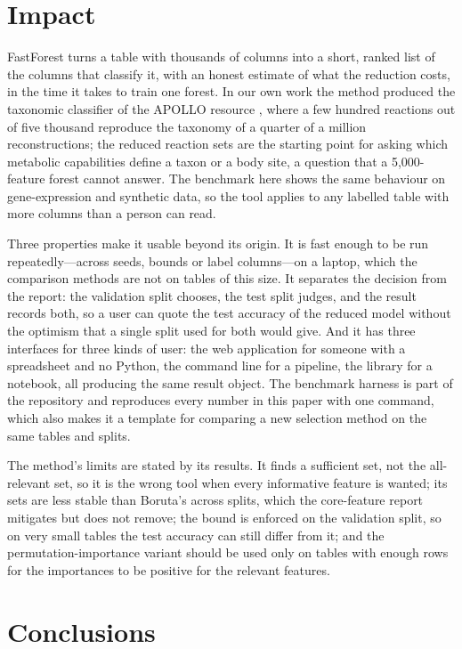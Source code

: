 \documentclass[11pt,a4paper]{article}
\begin{document}
\section{Impact}

FastForest turns a table with thousands of columns into a short, ranked list of the columns that classify it, with an honest estimate of what the reduction costs, in the time it takes to train one forest. In our own work the method produced the taxonomic classifier of the APOLLO resource \cite{heinken2025}, where a few hundred reactions out of five thousand reproduce the taxonomy of a quarter of a million reconstructions; the reduced reaction sets are the starting point for asking which metabolic capabilities define a taxon or a body site, a question that a 5,000-feature forest cannot answer. The benchmark here shows the same behaviour on gene-expression and synthetic data, so the tool applies to any labelled table with more columns than a person can read.

Three properties make it usable beyond its origin. It is fast enough to be run repeatedly---across seeds, bounds or label columns---on a laptop, which the comparison methods are not on tables of this size. It separates the decision from the report: the validation split chooses, the test split judges, and the result records both, so a user can quote the test accuracy of the reduced model without the optimism that a single split used for both would give. And it has three interfaces for three kinds of user: the web application for someone with a spreadsheet and no Python, the command line for a pipeline, the library for a notebook, all producing the same result object. The benchmark harness is part of the repository and reproduces every number in this paper with one command, which also makes it a template for comparing a new selection method on the same tables and splits.

The method's limits are stated by its results. It finds a sufficient set, not the all-relevant set, so it is the wrong tool when every informative feature is wanted; its sets are less stable than Boruta's across splits, which the core-feature report mitigates but does not remove; the bound is enforced on the validation split, so on very small tables the test accuracy can still differ from it; and the permutation-importance variant should be used only on tables with enough rows for the importances to be positive for the relevant features.

\section{Conclusions}
\end{document}
